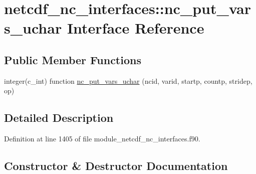 \hypertarget{interfacenetcdf__nc__interfaces_1_1nc__put__vars__uchar}{}\section{netcdf\+\_\+nc\+\_\+interfaces\+:\+:nc\+\_\+put\+\_\+vars\+\_\+uchar Interface Reference}
\label{interfacenetcdf__nc__interfaces_1_1nc__put__vars__uchar}
\subsection*{Public Member Functions}
\begin{DoxyCompactItemize}
\item 
integer(c\+\_\+int) function \hyperlink{interfacenetcdf__nc__interfaces_1_1nc__put__vars__uchar_a7367765d80520060802b27dbcc93cbf0}{nc\+\_\+put\+\_\+vars\+\_\+uchar} (ncid, varid, startp, countp, stridep, op)
\end{DoxyCompactItemize}


\subsection{Detailed Description}


Definition at line 1405 of file module\+\_\+netcdf\+\_\+nc\+\_\+interfaces.\+f90.



\subsection{Constructor \& Destructor Documentation}
\mbox{\label{interfacenetcdf__nc__interfaces_1_1nc__put__vars__uchar_a7367765d80520060802b27dbcc93cbf0}} 
